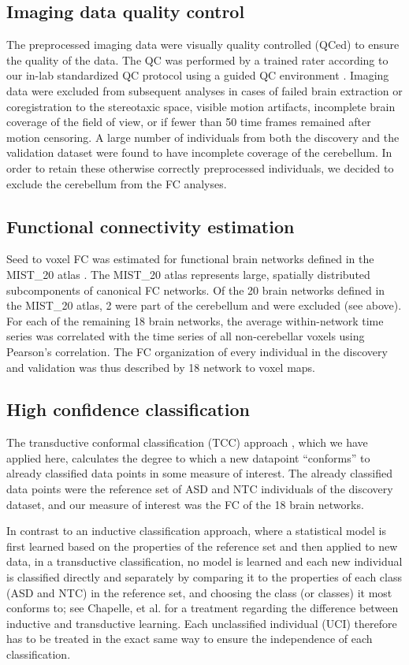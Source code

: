 \documentclass[9pt,lineno]{elife}
\begin{document}
\subsection{Imaging data quality control}
The preprocessed imaging data were visually quality controlled (QCed) to ensure the quality of the data. The QC was performed by a trained rater according to our in-lab standardized QC protocol \citep{Benhajali2019-yi} using a guided QC environment \citep{Urchs2018-ml}. Imaging data were excluded from subsequent analyses in cases of failed brain extraction or coregistration to the stereotaxic space, visible motion artifacts, incomplete brain coverage of the field of view, or if fewer than 50 time frames remained after motion censoring. A large number of individuals from both the discovery and the validation dataset were found to have incomplete coverage of the cerebellum. In order to retain these otherwise correctly preprocessed individuals, we decided to exclude the cerebellum from the FC analyses.

\subsection{Functional connectivity estimation}
Seed to voxel FC was estimated for functional brain networks defined in the MIST\_20 atlas \citep{Urchs2017-tl}. The MIST\_20 atlas represents large, spatially distributed subcomponents of canonical FC networks. Of the 20 brain networks defined in the MIST\_20 atlas, 2 were part of the cerebellum and were excluded (see above). For each of the remaining 18 brain networks, the average within-network time series was correlated with the time series of all non-cerebellar voxels using Pearson’s correlation. The FC organization of every individual in the discovery and validation was thus described by 18 network to voxel maps.

\subsection{High confidence classification}
The transductive conformal classification (TCC) approach \citep{Vovk2005-uc,Nouretdinov2011-ph}, which we have applied here, calculates the degree to which a new datapoint “conforms” to already classified data points in some measure of interest. The already classified data points were the reference set of ASD and NTC individuals of the discovery dataset, and our measure of interest was the FC of the 18 brain networks. 

In contrast to an inductive classification approach, where a statistical model is first learned based on the properties of the reference set and then applied to new data, in a transductive classification, no model is learned and each new individual is classified directly and separately by comparing it to the properties of each class (ASD and NTC) in the reference set, and choosing the class (or classes) it most conforms to; see Chapelle, et al. \citep{Chapelle2006-ex} for a treatment regarding the difference between inductive and transductive learning. Each unclassified individual (UCI) therefore has to be treated in the exact same way to ensure the independence of each classification.
\end{document}
